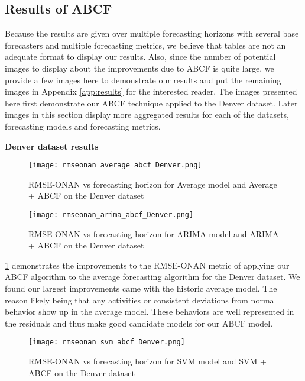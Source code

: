 \subsection{Results of ABCF}
Because the results are given over multiple forecasting horizons with several base forecasters and multiple forecasting metrics, we believe that tables are not an adequate format to display our results.  Also, since the number of potential images to display about the improvements due to ABCF is quite large, we provide a few images here to demonstrate our results and put the remaining images in Appendix \ref{app:results} for the interested reader.  The images presented here first demonstrate our ABCF technique applied to the Denver dataset.  Later images in this section display more aggregated results for each of the datasets, forecasting models and forecasting metrics.

\bigskip
\noindent \textbf{Denver dataset results} 

\begin{figure}[p]
	\begin{center}
		\texttt{[image: rmseonan\_average\_abcf\_Denver.png]}
	\end{center}
	\caption{RMSE-ONAN vs forecasting horizon for Average model and Average + ABCF on the Denver dataset}
	\label{fig:average_abcf_rmseonan_denver}
\end{figure}

\begin{figure}[p]
	\begin{center}
		\texttt{[image: rmseonan\_arima\_abcf\_Denver.png]}
	\end{center}
	\caption{RMSE-ONAN vs forecasting horizon for ARIMA model and ARIMA + ABCF on the Denver dataset}
	\label{fig:arima_abcf_rmseonan_denver}
\end{figure}


\ref{fig:average_abcf_rmseonan_denver} demonstrates the improvements to the RMSE-ONAN metric of applying our ABCF algorithm to the average forecasting algorithm for the Denver dataset.  We found our largest improvements came with the historic average model.  The reason likely being that any activities or consistent deviations from normal behavior show up in the average model.  These behaviors are well represented in the residuals and thus make good candidate models for our ABCF model.


\begin{figure}[p]
	\begin{center}
		\texttt{[image: rmseonan\_svm\_abcf\_Denver.png]}
	\end{center}
	\caption{RMSE-ONAN vs forecasting horizon for SVM model and SVM + ABCF on the Denver dataset}
	\label{fig:svm_abcf_rmseonan_denver}
\end{figure}

